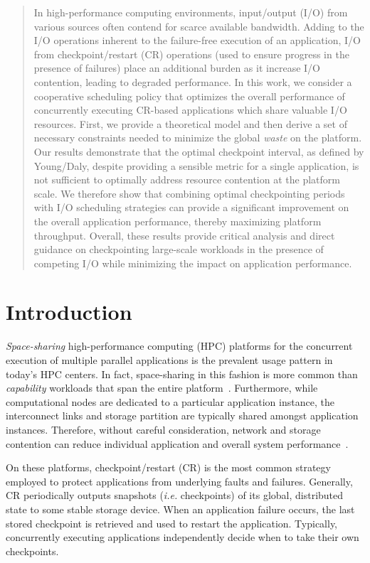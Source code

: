 \documentclass[two]{article}
\newcommand{\ie}[0]{\emph{i.e.}\xspace}
\begin{document}
\begin{abstract}
In high-performance computing environments, input/output (I/O) from various
sources often contend for scarce available bandwidth. Adding to the I/O
operations inherent to the failure-free execution of an application, I/O
from checkpoint/restart (CR) operations (used to ensure progress in the presence
of failures) place an additional burden as it increase I/O contention,
leading to degraded performance.  In this work, we consider a cooperative scheduling policy that optimizes the
overall performance of concurrently executing CR-based applications which share
valuable I/O resources.  First, we provide a theoretical model and then derive a set
of necessary constraints needed to minimize the global \emph{waste} on the
platform.
  Our results demonstrate that the optimal checkpoint interval, as defined by
Young/Daly, despite providing a sensible metric for a single application, is not
sufficient to optimally address resource contention at the platform scale.  We
therefore show that combining optimal checkpointing periods with I/O scheduling
strategies can provide a significant improvement on the overall application
performance, thereby maximizing platform throughput.
Overall, these results provide critical analysis and direct guidance on checkpointing
large-scale workloads in the presence of competing I/O while minimizing the impact
on application performance.
\end{abstract}


\section{Introduction}
\label{sec:intro}

\emph{Space-sharing} high-performance computing (HPC) platforms for the
concurrent execution of multiple parallel applications is the prevalent usage
pattern in today's HPC centers.  In fact, space-sharing in this fashion is more
common than \emph{capability} workloads that span the entire
platform~\cite{Weidner2016}. Furthermore, while computational nodes are
dedicated to a particular application instance, the interconnect links and
storage partition are typically shared amongst application instances.
Therefore, without careful consideration, network and storage contention can
reduce individual application and overall system
performance~\cite{Bhatele:2013:Neighborhood}.

On these platforms, checkpoint/restart (CR) is the most common strategy
employed to protect applications from underlying faults and failures.
Generally, CR periodically outputs snapshots (\ie checkpoints) of its global,
distributed state to some stable storage device. When an application failure
occurs, the last stored checkpoint is retrieved and used to restart the
application.  Typically, concurrently executing applications independently
decide when to take their own checkpoints.
\end{document}
